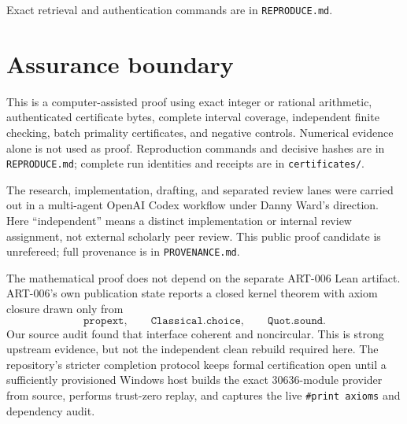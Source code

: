 \documentclass[11pt]{article}
\begin{document}
Exact retrieval and authentication commands are in \texttt{REPRODUCE.md}.

\section{Assurance boundary}

This is a computer-assisted proof using exact integer or rational arithmetic,
authenticated certificate bytes, complete interval coverage, independent
finite checking, batch primality certificates, and negative controls.
Numerical evidence alone is not used as proof.  Reproduction commands and
decisive hashes are in \texttt{REPRODUCE.md}; complete run identities and
receipts are in \texttt{certificates/}.

The research, implementation, drafting, and separated review lanes were
carried out in a multi-agent OpenAI Codex workflow under Danny Ward's
direction.  Here ``independent'' means a distinct implementation or internal
review assignment, not external scholarly peer review.  This public proof
candidate is unrefereed; full provenance is in \texttt{PROVENANCE.md}.

The mathematical proof does not depend on the separate ART-006 Lean artifact.
ART-006's own publication state reports a closed kernel theorem with axiom
closure drawn only from
\[
 \texttt{propext},\qquad
 \texttt{Classical.choice},\qquad
 \texttt{Quot.sound}.
\]
Our source audit found that interface coherent and noncircular.  This is
strong upstream evidence, but not the independent clean rebuild required
here.  The repository's stricter completion protocol keeps formal
certification open until a sufficiently provisioned Windows host builds the
exact 30636-module provider from source, performs trust-zero replay, and
captures the live \texttt{\#print axioms} and dependency audit.
\end{document}
